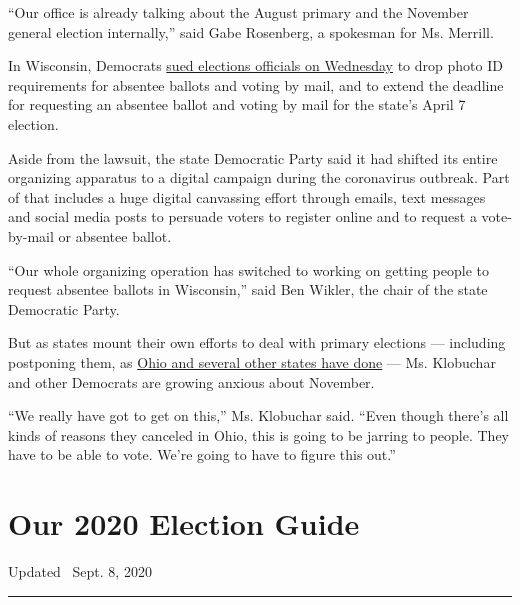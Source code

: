 ``Our office is already talking about the August primary and the
November general election internally,'' said Gabe Rosenberg, a spokesman
for Ms. Merrill.

In Wisconsin, Democrats
\href{https://www.nytimes3xbfgragh.onion/2020/03/18/us/politics/wisconsin-primary-voting-coronavirus.html}{sued
elections officials on Wednesday} to drop photo ID requirements for
absentee ballots and voting by mail, and to extend the deadline for
requesting an absentee ballot and voting by mail for the state's April 7
election.

Aside from the lawsuit, the state Democratic Party said it had shifted
its entire organizing apparatus to a digital campaign during the
coronavirus outbreak. Part of that includes a huge digital canvassing
effort through emails, text messages and social media posts to persuade
voters to register online and to request a vote-by-mail or absentee
ballot.

``Our whole organizing operation has switched to working on getting
people to request absentee ballots in Wisconsin,'' said Ben Wikler, the
chair of the state Democratic Party.

But as states mount their own efforts to deal with primary elections ---
including postponing them, as
\href{https://www.nytimes3xbfgragh.onion/2020/03/16/us/politics/virus-primary-2020-ohio.html}{Ohio
and several other states have done} --- Ms. Klobuchar and other
Democrats are growing anxious about November.

``We really have got to get on this,'' Ms. Klobuchar said. ``Even though
there's all kinds of reasons they canceled in Ohio, this is going to be
jarring to people. They have to be able to vote. We're going to have to
figure this out.''

\hypertarget{our-2020-election-guide}{%
\section{Our 2020 Election Guide}\label{our-2020-election-guide}}

Updated ~Sept. 8, 2020

\begin{center}\rule{0.5\linewidth}{\linethickness}\end{center}


